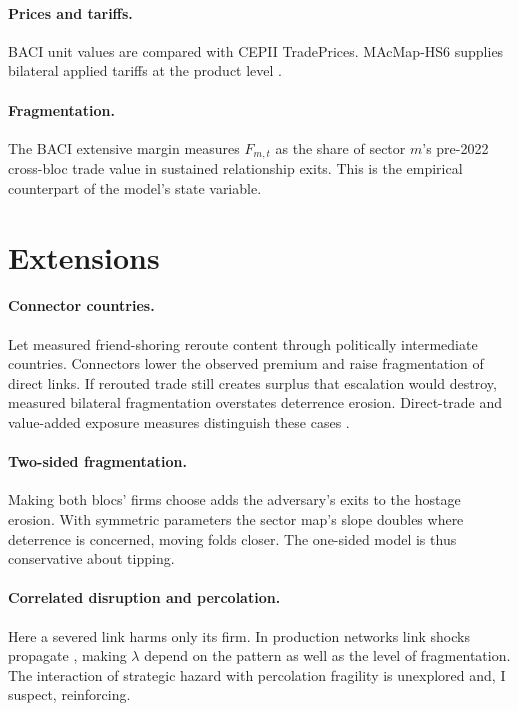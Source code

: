 \documentclass[11pt]{article}
\theoremstyle{definition}
\begin{document}
\paragraph{Prices and tariffs.} BACI unit values are compared with CEPII TradePrices. MAcMap-HS6 supplies bilateral applied tariffs at the product level \citep{CEPIITradePrices,CEPIIMAcMap}.

\paragraph{Fragmentation.} The BACI extensive margin measures $F_{m,t}$ as the share of sector $m$'s pre-2022 cross-bloc trade value in sustained relationship exits. This is the empirical counterpart of the model's state variable.

\section{Extensions}\label{app:extensions}

\paragraph{Connector countries.} Let measured friend-shoring reroute content through politically intermediate countries. Connectors lower the observed premium and raise fragmentation of direct links. If rerouted trade still creates surplus that escalation would destroy, measured bilateral fragmentation overstates deterrence erosion. Direct-trade and value-added exposure measures distinguish these cases \citep{GopinathEtAl2025JIE,FreundEtAl2023}.

\paragraph{Two-sided fragmentation.} Making both blocs' firms choose adds the adversary's exits to the hostage erosion. With symmetric parameters the sector map's slope doubles where deterrence is concerned, moving folds closer. The one-sided model is thus conservative about tipping.

\paragraph{Correlated disruption and percolation.} Here a severed link harms only its firm. In production networks link shocks propagate \citep{ElliottGolubLeduc2022, BaqaeeFarhi2019}, making $\lambda$ depend on the pattern as well as the level of fragmentation. The interaction of strategic hazard with percolation fragility is unexplored and, I suspect, reinforcing.
\end{document}
